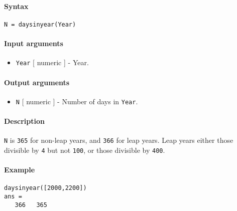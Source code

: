 


	\paragraph{Syntax}\label{syntax}

\begin{verbatim}
N = daysinyear(Year)
\end{verbatim}

\paragraph{Input arguments}\label{input-arguments}

\begin{itemize}
\itemsep1pt\parskip0pt
\item
  \texttt{Year} {[} numeric {]} - Year.
\end{itemize}

\paragraph{Output arguments}\label{output-arguments}

\begin{itemize}
\itemsep1pt\parskip0pt
\item
  \texttt{N} {[} numeric {]} - Number of days in \texttt{Year}.
\end{itemize}

\paragraph{Description}\label{description}

\texttt{N} is \texttt{365} for non-leap years, and \texttt{366} for leap
years. Leap years either those divisible by \texttt{4} but not
\texttt{100}, or those divisible by \texttt{400}.

\paragraph{Example}\label{example}

\begin{verbatim}
daysinyear([2000,2200])
ans =
   366   365
\end{verbatim}



